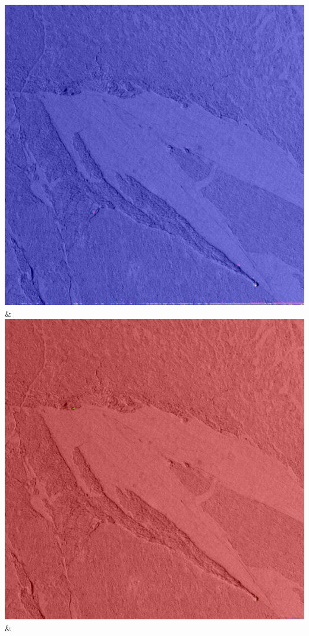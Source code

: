 \begin{table}[h!]
\begin{tabularx}{\textwidth}
		\includegraphics[width=0.9\linewidth]{images/gen/number_of_segments/p03_03.png_10.png} &
		\includegraphics[width=0.9\linewidth]{images/gen/number_of_segments/p03_03.png_20.png} &

\end{tabularx}
\end{table}
